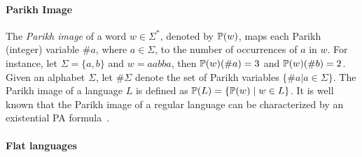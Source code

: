 \paragraph{Parikh Image}
%
The \emph{Parikh image} of a word $w \in \Sigma^*$, denoted by $\mathbb{P}(w)$, maps each Parikh (integer) variable $\#a$, where $a \in \Sigma$, to the number of occurrences of $a$ in $w$. 
For instance, let $\Sigma = \{a,b\}$ and $w= aabba$,
then $\mathbb{P}(w)(\#a)=3$ and $\mathbb{P}(w)(\#b)=2$.
Given an alphabet $\Sigma$, let $\#\Sigma$ denote the set of Parikh variables $\{\#a | a \in \Sigma\}$. 
The Parikh image of a language $L$ is defined as $\mathbb{P}(L) = \{\mathbb{P}(w) \mid w \in L\}$. It is well known that the Parikh image of a regular language can be characterized by an existential PA formula~\cite{SSMH04}.








\paragraph{Flat languages}



